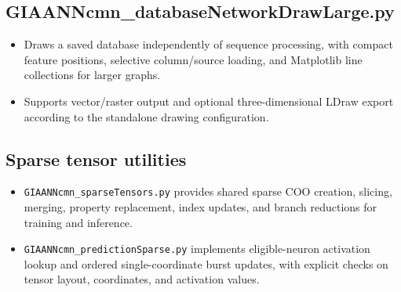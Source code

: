 \subsection{GIAANNcmn\_databaseNetworkDrawLarge.py}
\begin{itemize}
	\item Draws a saved database independently of sequence processing, with compact feature positions, selective column/source loading, and Matplotlib line collections for larger graphs.
	\item Supports vector/raster output and optional three-dimensional LDraw export according to the standalone drawing configuration.
\end{itemize}

\subsection{Sparse tensor utilities}
\begin{itemize}
	\item \texttt{GIAANNcmn\_sparseTensors.py} provides shared sparse COO creation, slicing, merging, property replacement, index updates, and branch reductions for training and inference.
	\item \texttt{GIAANNcmn\_predictionSparse.py} implements eligible-neuron activation lookup and ordered single-coordinate burst updates, with explicit checks on tensor layout, coordinates, and activation values.
\end{itemize}

